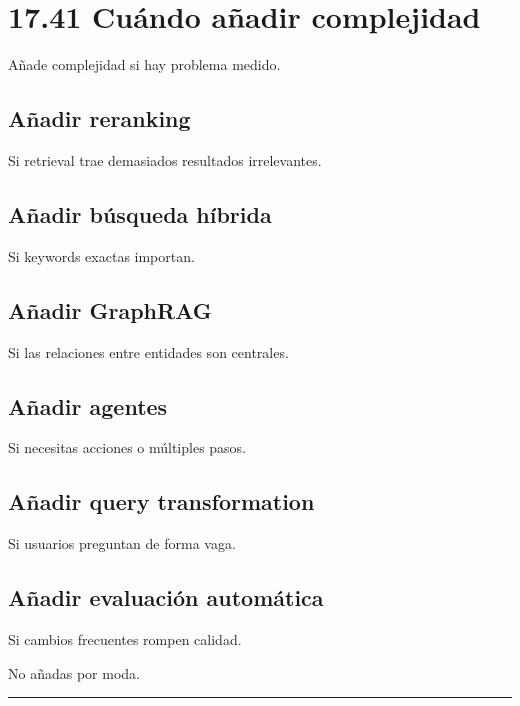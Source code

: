 \section{17.41 Cuándo añadir
complejidad}\label{cuuxe1ndo-auxf1adir-complejidad}

Añade complejidad si hay problema medido.

\subsection{Añadir reranking}\label{auxf1adir-reranking}

Si retrieval trae demasiados resultados irrelevantes.

\subsection{Añadir búsqueda
híbrida}\label{auxf1adir-buxfasqueda-huxedbrida}

Si keywords exactas importan.

\subsection{Añadir GraphRAG}\label{auxf1adir-graphrag}

Si las relaciones entre entidades son centrales.

\subsection{Añadir agentes}\label{auxf1adir-agentes}

Si necesitas acciones o múltiples pasos.

\subsection{Añadir query
transformation}\label{auxf1adir-query-transformation}

Si usuarios preguntan de forma vaga.

\subsection{Añadir evaluación
automática}\label{auxf1adir-evaluaciuxf3n-automuxe1tica}

Si cambios frecuentes rompen calidad.

No añadas por moda.

\begin{center}\rule{0.5\linewidth}{0.5pt}\end{center}

